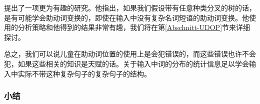
 \citet{Bod2009a}提出了一项更为有趣的研究。他指出，如果我们假设带有任意种类分叉的树的话，是有可能学会助动词变换的，即使在输入中没有复杂名词短语的助动词变换。他使用的分析策略和他得到的结果非常有趣，我们将在第\ref{Abschnitt-UDOP}节来详细探讨。

总之，我们可以说儿童在助动词位置的使用上是会犯错误的，而这些错误也许不会犯，如果这些相关的知识是天赋的话。关于输入中词的分布的统计信息足以学会输入中实际不带这种复杂句子的复杂句子的结构。

\subsubsection{小结}

